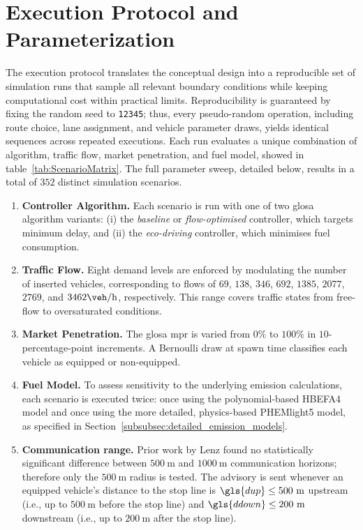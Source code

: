 \section{Execution Protocol and Parameterization}
\label{sec:exec_protocol}

The execution protocol translates the conceptual design into a reproducible set of simulation runs that sample all relevant boundary conditions while keeping computational cost within practical limits. Reproducibility is guaranteed by fixing the random seed to \texttt{12345}; thus, every pseudo-random operation, including route choice, lane assignment, and vehicle parameter draws, yields identical sequences across repeated executions.
\mynewline
Each run evaluates a unique combination of algorithm, traffic flow, market penetration, and fuel model, showed in table~\vref{tab:ScenarioMatrix}. The full parameter sweep, detailed below, results in a total of $352$ distinct simulation scenarios.
\mynewline

\begin{enumerate}
    \item \textbf{Controller Algorithm.} Each scenario is run with one of two \ac{glosa} algorithm variants: (i) the \emph{baseline} or \emph{flow-optimised} controller, which targets minimum delay, and (ii) the \emph{eco-driving} controller, which minimises fuel consumption.
    
    \item \textbf{Traffic Flow.} Eight demand levels are enforced by modulating the number of inserted vehicles, corresponding to flows of $69$, $138$, $346$, $692$, $1385$, $2077$, $2769$, and $3462\unit{\veh\per\hour}$, respectively. This range covers traffic states from free-flow to oversaturated conditions.
    
    \item \textbf{Market Penetration.} The \ac{glosa} \ac{mpr} is varied from $0\%$ to $100\%$ in $10$-percentage-point increments. A Bernoulli draw at spawn time classifies each vehicle as equipped or non-equipped.

    \item \textbf{Fuel Model.} To assess sensitivity to the underlying emission calculations, each scenario is executed twice: once using the polynomial-based HBEFA4 model and once using the more detailed, physics-based PHEMlight5 model, as specified in Section~\ref{subsubsec:detailed_emission_models}.

    \item \textbf{Communication range.} Prior work by Lenz \cite{Lenz2024} found no statistically significant difference between $500~\unit{\meter}$ and $1000~\unit{\meter}$ communication horizons; therefore only the $500~\unit{\meter}$ radius is tested. The advisory is sent whenever an equipped vehicle’s distance to the stop line is $\gls{dup} \leq 500~\unit{\meter}$ upstream (i.e., up to $500~\unit{\meter}$ before the stop line) and $\gls{ddown} \leq 200~\unit{\meter}$ downstream (i.e., up to $200~\unit{\meter}$ after the stop line).
\end{enumerate}

